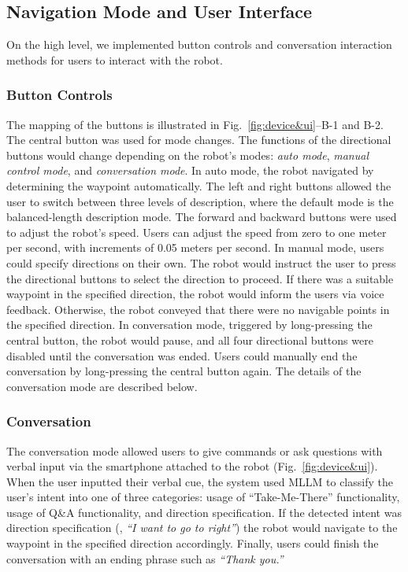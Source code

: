 

\subsection{Navigation Mode and User Interface}
On the high level, we implemented button controls and conversation interaction methods for users to interact with the robot.

\subsubsection{Button Controls}
\label{sec:implementation_button}
The mapping of the buttons is illustrated in Fig.~\ref{fig:device&ui}--B-1 and B-2.
The central button was used for mode changes.
The functions of the directional buttons would change depending on the robot's modes:  \textit{auto mode}, \textit{manual control mode}, and \textit{conversation mode}.
In auto mode, the robot navigated by determining the waypoint automatically.
The left and right buttons allowed the user to switch between three levels of description, where the default mode is the balanced-length description mode. 
The forward and backward buttons were used to adjust the robot’s speed.
Users can adjust the speed from zero to one meter per second, with increments of 0.05 meters per second.
In manual mode, users could specify directions on their own.
The robot would instruct the user to press the directional buttons to select the direction to proceed.
If there was a suitable waypoint in the specified direction, the robot would inform the users via voice feedback.
Otherwise, the robot conveyed that there were no navigable points in the specified direction.
In conversation mode, triggered by long-pressing the central button, the robot would pause, and all four directional buttons were disabled until the conversation was ended.
Users could manually end the conversation by long-pressing the central button again.
The details of the conversation mode are described below.

\subsubsection{Conversation}
\label{sec:QA}
The conversation mode allowed users to give commands or ask questions with verbal input via the smartphone attached to the robot (Fig.~\ref{fig:device&ui}).
When the user inputted their verbal cue, the system used MLLM to classify the user's intent into one of three categories: usage of ``Take-Me-There'' functionality, usage of Q\&A functionality, and direction specification.
If the detected intent was direction specification (\eg, \textit{``I want to go to right''}) the robot would navigate to the waypoint in the specified direction accordingly.
Finally, users could finish the conversation with an ending phrase such as \textit{``Thank you.'' }
